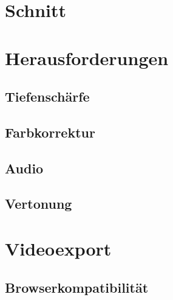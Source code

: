 \section{Schnitt}

\section{Herausforderungen}
\subsection{Tiefenschärfe}
\subsection{Farbkorrektur}
\subsection{Audio}
\subsection{Vertonung}

\section{Videoexport}
\subsection{Browserkompatibilität}
